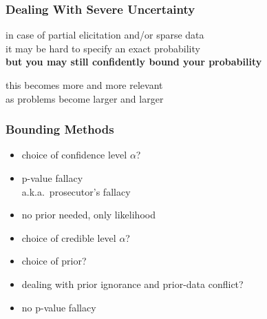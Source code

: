 \documentclass{beamer}
\newcommand{\gplus}{\structure{\textbf{+}}}
\newcommand{\gmins}{\structure{\textbf{--}}}
\begin{document}
\begin{frame}
  \frametitle{Dealing With Severe Uncertainty}
  \begin{alertblock}{}
    in case of \alert{partial elicitation} and/or \alert{sparse data}
    \\
    it may be hard to specify an exact probability
    \\
    \textbf{but you may still confidently bound your probability}
  \end{alertblock}
  \vspace{2em}
  this becomes more and more relevant \\
  as problems become larger and larger
\end{frame}

\begin{frame}
  \frametitle{Bounding Methods} %
    \begin{itemize}
  \setlength{\itemsep}{0pt}
  \setlength{\parskip}{0pt}
  \setlength{\parsep}{0pt}
    \item[\gmins] choice of confidence level $\alpha$?
    \item[\gmins] p-value fallacy \parencite{2004:gigerenzer}\\ a.k.a.\ prosecutor's fallacy
    \item[\gplus] no prior needed, only likelihood
    \end{itemize}
  \vspace*{1ex}
\pause
{}
      \begin{itemize}
  \setlength{\itemsep}{0pt}
  \setlength{\parskip}{0pt}
  \setlength{\parsep}{0pt}
      \item[\gmins] choice of credible level $\alpha$?
      \item[\gmins] choice of prior?
      \item[\gmins] dealing with prior ignorance and prior-data conflict?
      \item[\gplus] no p-value fallacy
      \end{itemize}

\end{frame}
\end{document}

